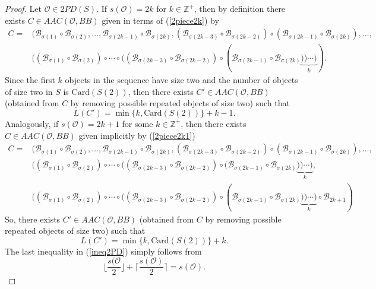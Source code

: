 \documentclass[10pt,a4paper]{amsart}
\begin{document}
\begin{proof}
Let $\mathscr{O} \in 2PD(S)$. If $s(\mathscr{O})=2k$ for $k \in \mathbb{Z}^+$, then by definition there exists $C \in AAC(\mathscr{O},BB)$ given in terms of (\ref{2piece2k}) by  
\begin{equation*}
\begin{split}
   C= & (\mathscr{B}_{\sigma(1)} \circ \mathscr{B}_{\sigma(2)}, \dots,\mathscr{B}_{\sigma(2k-1)} \circ \mathscr{B}_{\sigma(2k)}, (\mathscr{B}_{\sigma(2k-3)} \circ \mathscr{B}_{\sigma(2k-2)}) \circ (\mathscr{B}_{\sigma(2k-1)} \circ \mathscr{B}_{\sigma(2k)}),\dots,\\& ((\mathscr{B}_{\sigma(1)} \circ \mathscr{B}_{\sigma(2)}) \circ \cdots \circ ((\mathscr{B}_{\sigma(2k-3)} \circ \mathscr{B}_{\sigma(2k-2)}) \circ (\mathscr{B}_{\sigma(2k-1)} \circ \mathscr{B}_{\sigma(2k)}\underbrace{)) \cdots )}_{k}). 
   \end{split}
\end{equation*}
Since the first $k$ objects in the sequence have size two and the number of objects of size two in $S$ is $\text{Card}(S(2))$, then there exists $C' \in AAC(\mathscr{O},BB)$ (obtained from $C$ by removing possible repeated objects of size two) such that  
\begin{equation*}
    L(C')= \min \{k, \text{Card}(S(2)) \} + k-1.
\end{equation*}
Analogously, if $s(\mathscr{O})=2k+1$ for some $k \in \mathbb{Z}^+$, then there exists $C \in AAC(\mathscr{O},BB)$ given implicitly by (\ref{2piece2k1})
\begin{equation*}
\begin{split}
   C= & (\mathscr{B}_{\sigma(1)} \circ \mathscr{B}_{\sigma(2)}, \dots,\mathscr{B}_{\sigma(2k-1)} \circ \mathscr{B}_{\sigma(2k)}, (\mathscr{B}_{\sigma(2k-3)} \circ \mathscr{B}_{\sigma(2k-2)}) \circ (\mathscr{B}_{\sigma(2k-1)} \circ \mathscr{B}_{\sigma(2k)}),\dots,\\& ((\mathscr{B}_{\sigma(1)} \circ \mathscr{B}_{\sigma(2)}) \circ \cdots \circ ((\mathscr{B}_{\sigma(2k-3)} \circ \mathscr{B}_{\sigma(2k-2)}) \circ (\mathscr{B}_{\sigma(2k-1)} \circ \mathscr{B}_{\sigma(2k)}\underbrace{)) \cdots )}_{k},\\
   & ((\mathscr{B}_{\sigma(1)} \circ \mathscr{B}_{\sigma(2)}) \circ \cdots \circ ((\mathscr{B}_{\sigma(2k-3)} \circ \mathscr{B}_{\sigma(2k-2)}) \circ (\mathscr{B}_{\sigma(2k-1)} \circ \mathscr{B}_{\sigma(2k)}\underbrace{)) \cdots )}_{k}\circ \mathscr{B}_{2k+1}) 
   \end{split}
\end{equation*}
So, there exists $C' \in AAC(\mathscr{O},BB)$ (obtained from $C$ by removing possible repeated objects of size two) such that 
\begin{equation*}
    L(C')= \min \{k, \text{Card}(S(2)) \} + k.
\end{equation*}
The last inequality in (\ref{ineq2PD}) simply follows from 
\begin{equation*}
   \bigg\lfloor \frac{s(\mathscr{O}}{2} \bigg\rfloor + \bigg\lceil \frac{s(\mathscr{O})}{2} \bigg\rceil = s(\mathscr{O}).
\end{equation*}
\end{proof}
\end{document}

